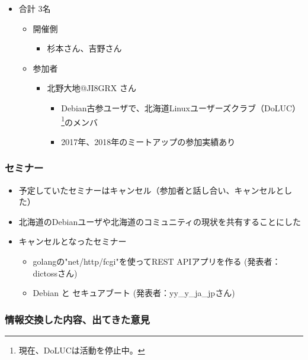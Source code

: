 \documentclass[mingoth,a4paper]{jsarticle}
\begin{document}
\begin{itemize}
\item 合計 3名
  \begin{itemize}
  \item 開催側
    \begin{itemize}
    \item 杉本さん、吉野さん
    \end{itemize}
  \item 参加者
    \begin{itemize}
    \item 北野大地@JI8GRX さん
      \begin{itemize}
      \item Debian古参ユーザで、北海道Linuxユーザーズクラブ（DoLUC）\footnote{現在、DoLUCは活動を停止中。}のメンバ
      \item 2017年、2018年のミートアップの参加実績あり
      \end{itemize}
    \end{itemize}
  \end{itemize}
\end{itemize}


\subsubsection{セミナー}

\begin{itemize}
\item 予定していたセミナーはキャンセル（参加者と話し合い、キャンセルとした）
\item 北海道のDebianユーザや北海道のコミュニティの現状を共有することにした
\item キャンセルとなったセミナー
  \begin{itemize}
  \item golangの"net/http/fcgi"を使ってREST APIアプリを作る (発表者：dictossさん)
  \item Debian と セキュアブート (発表者：yy\_y\_ja\_jpさん)
  \end{itemize}
\end{itemize}

  
\subsubsection{情報交換した内容、出てきた意見}

  
\end{document}
